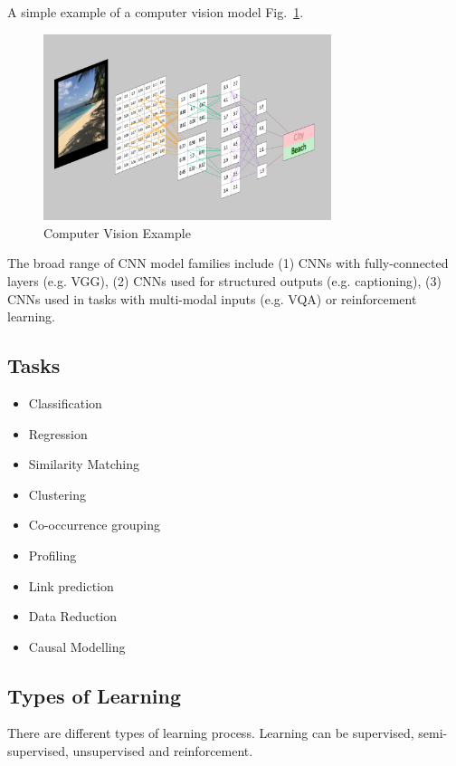 A simple example of a computer vision model Fig.~\ref{fig:CNN-2}.
\begin{figure}[htbp]
\centering
\includegraphics[width=0.75\textwidth]{images/CNN.png}
\caption{Computer Vision Example}
\label{fig:CNN-2}
\end{figure}

The broad range of CNN model families include (1) CNNs with fully-connected layers (e.g. VGG), (2) CNNs used for structured outputs (e.g. captioning), (3) CNNs used in tasks with multi-modal inputs (e.g. VQA) or reinforcement learning.

\vspace{15mm}

\subsection{Tasks}
\begin{itemize}
\item Classification
\item Regression
\item Similarity Matching
\item Clustering
\item Co-occurrence grouping
\item Profiling
\item Link prediction
\item Data Reduction
\item Causal Modelling
\end{itemize}

\subsection{Types of Learning}

There are different types of learning process. Learning can be supervised, semi-supervised, unsupervised and reinforcement.

